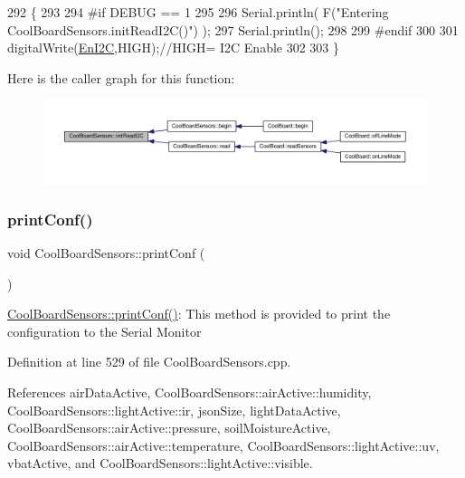 \begin{DoxyCode}
292 \{
293 
294 \textcolor{preprocessor}{#if DEBUG == 1}
295 
296     Serial.println( F(\textcolor{stringliteral}{"Entering CoolBoardSensors.initReadI2C()"}) );
297     Serial.println();
298 
299 \textcolor{preprocessor}{#endif}
300  
301     digitalWrite(\hyperlink{classCoolBoardSensors_aaa6b5dbf3a6633bffd9d204d961096dc}{EnI2C},HIGH);\textcolor{comment}{//HIGH= I2C Enable}
302 
303 \}
\end{DoxyCode}
Here is the caller graph for this function\+:\nopagebreak
\begin{figure}[H]
\begin{center}
\leavevmode
\includegraphics[width=350pt]{classCoolBoardSensors_acad6a8418c66d36868caca23c844ecb6_icgraph}
\end{center}
\end{figure}
\mbox{\label{classCoolBoardSensors_af6fd79505815b204c178617ecf54c873}} 
\subsubsection{\texorpdfstring{print\+Conf()}{printConf()}}
{\footnotesize\ttfamily void Cool\+Board\+Sensors\+::print\+Conf (\begin{DoxyParamCaption}{ }\end{DoxyParamCaption})}

\hyperlink{classCoolBoardSensors_af6fd79505815b204c178617ecf54c873}{Cool\+Board\+Sensors\+::print\+Conf()}\+: This method is provided to print the configuration to the Serial Monitor 

Definition at line 529 of file Cool\+Board\+Sensors.\+cpp.



References air\+Data\+Active, Cool\+Board\+Sensors\+::air\+Active\+::humidity, Cool\+Board\+Sensors\+::light\+Active\+::ir, json\+Size, light\+Data\+Active, Cool\+Board\+Sensors\+::air\+Active\+::pressure, soil\+Moisture\+Active, Cool\+Board\+Sensors\+::air\+Active\+::temperature, Cool\+Board\+Sensors\+::light\+Active\+::uv, vbat\+Active, and Cool\+Board\+Sensors\+::light\+Active\+::visible.



